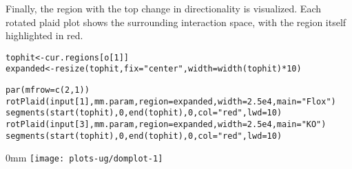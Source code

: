 \documentclass{report}\usepackage[]{graphicx}\usepackage[usenames,dvipsnames]{color}
\makeatletter
\def\maxwidth{ %
  \ifdim\Gin@nat@width>\linewidth
    \linewidth
  \else
    \Gin@nat@width
  \fi
}
\newcommand{\hlnum}[1]{\textcolor[rgb]{0.816,0.125,0.439}{#1}}%
\newcommand{\hlstr}[1]{\textcolor[rgb]{0.251,0.627,0.251}{#1}}%
\newcommand{\hlopt}[1]{\textcolor[rgb]{0,0,0}{#1}}%
\newcommand{\hlstd}[1]{\textcolor[rgb]{0.251,0.251,0.251}{#1}}%
\newcommand{\hlkwb}[1]{\textcolor[rgb]{0,0,0}{#1}}%
\newcommand{\hlkwc}[1]{\textcolor[rgb]{0.251,0.251,0.251}{#1}}%
\newcommand{\hlkwd}[1]{\textcolor[rgb]{0.878,0.439,0.125}{#1}}%
\newenvironment{knitrout}{}{} %
\makeatother
\begin{document}
\begin{knitrout}
\color{fgcolor}
\end{knitrout}

Finally, the region with the top change in directionality is visualized.
Each rotated plaid plot shows the surrounding interaction space, with the region itself highlighted in red.

\begin{knitrout}
\color{fgcolor}\begin{kframe}
\begin{alltt}
\hlstd{tophit} \hlkwb{<-} \hlstd{cur.regions[o[}\hlnum{1}\hlstd{]]}
\hlstd{expanded} \hlkwb{<-} \hlkwd{resize}\hlstd{(tophit,} \hlkwc{fix}\hlstd{=}\hlstr{"center"}\hlstd{,} \hlkwc{width}\hlstd{=}\hlkwd{width}\hlstd{(tophit)}\hlopt{*}\hlnum{10}\hlstd{)}

\hlkwd{par}\hlstd{(}\hlkwc{mfrow}\hlstd{=}\hlkwd{c}\hlstd{(}\hlnum{2}\hlstd{,}\hlnum{1}\hlstd{))}
\hlkwd{rotPlaid}\hlstd{(input[}\hlnum{1}\hlstd{], mm.param,} \hlkwc{region}\hlstd{=expanded,} \hlkwc{width}\hlstd{=}\hlnum{2.5e4}\hlstd{,} \hlkwc{main}\hlstd{=}\hlstr{"Flox"}\hlstd{)}
\hlkwd{segments}\hlstd{(}\hlkwd{start}\hlstd{(tophit),} \hlnum{0}\hlstd{,} \hlkwd{end}\hlstd{(tophit),} \hlnum{0}\hlstd{,} \hlkwc{col}\hlstd{=}\hlstr{"red"}\hlstd{,} \hlkwc{lwd}\hlstd{=}\hlnum{10}\hlstd{)}
\hlkwd{rotPlaid}\hlstd{(input[}\hlnum{3}\hlstd{], mm.param,} \hlkwc{region}\hlstd{=expanded,} \hlkwc{width}\hlstd{=}\hlnum{2.5e4}\hlstd{,} \hlkwc{main}\hlstd{=}\hlstr{"KO"}\hlstd{)}
\hlkwd{segments}\hlstd{(}\hlkwd{start}\hlstd{(tophit),} \hlnum{0}\hlstd{,} \hlkwd{end}\hlstd{(tophit),} \hlnum{0}\hlstd{,} \hlkwc{col}\hlstd{=}\hlstr{"red"}\hlstd{,} \hlkwc{lwd}\hlstd{=}\hlnum{10}\hlstd{)}
\end{alltt}
\end{kframe}\begin{adjustwidth}{\fltoffset}{0mm}
\texttt{[image: plots-ug/domplot-1]} \end{adjustwidth}
\end{knitrout}
\end{document}
